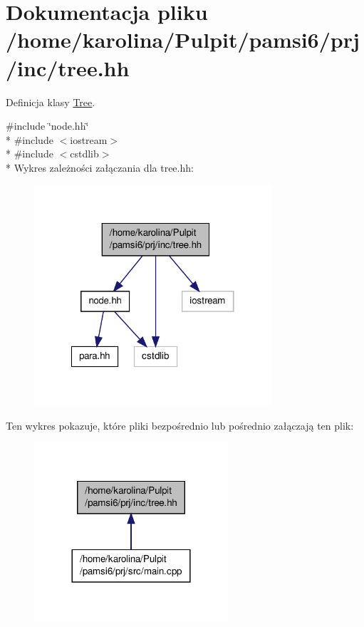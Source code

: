 \hypertarget{tree_8hh}{\section{Dokumentacja pliku /home/karolina/\-Pulpit/pamsi6/prj/inc/tree.hh}
\label{tree_8hh}
}


Definicja klasy \hyperlink{class_tree}{Tree}.  


{\ttfamily \#include \char`\"{}node.\-hh\char`\"{}}\\*
{\ttfamily \#include $<$iostream$>$}\\*
{\ttfamily \#include $<$cstdlib$>$}\\*
Wykres zależności załączania dla tree.\-hh\-:\nopagebreak
\begin{figure}[H]
\begin{center}
\leavevmode
\includegraphics[width=250pt]{tree_8hh__incl}
\end{center}
\end{figure}
Ten wykres pokazuje, które pliki bezpośrednio lub pośrednio załączają ten plik\-:\nopagebreak
\begin{figure}[H]
\begin{center}
\leavevmode
\includegraphics[width=204pt]{tree_8hh__dep__incl}
\end{center}
\end{figure}
